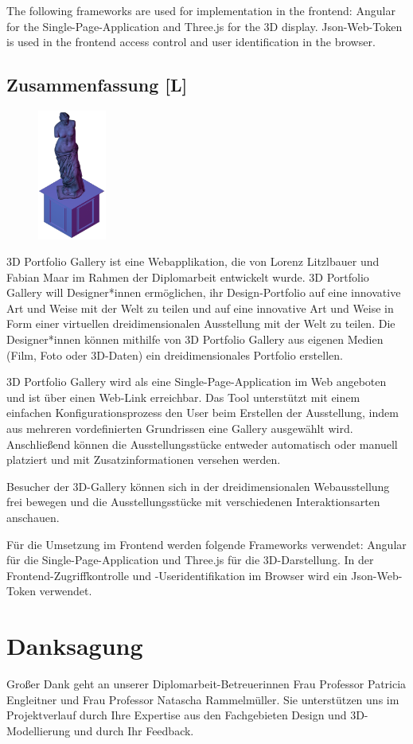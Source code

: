 The following frameworks are used for implementation in the frontend: Angular for the Single-Page-Application and Three.js for the 3D display. Json-Web-Token is used in the frontend access control and user identification in the browser.
\newpage
\begin{spacing}{1}
    \chapter*{Zusammenfassung [L]}
\end{spacing}
\begin{figure}
    \begin{center}
      \includegraphics[width=0.2\textwidth]{pics/statue.png}
    \end{center}
\end{figure}
3D Portfolio Gallery ist eine Webapplikation, die von Lorenz Litzlbauer und Fabian Maar im Rahmen der Diplomarbeit entwickelt wurde. 3D Portfolio Gallery will Designer*innen ermöglichen, ihr Design-Portfolio auf eine innovative Art und Weise mit der Welt zu teilen und auf eine innovative Art und Weise in Form einer virtuellen dreidimensionalen Ausstellung mit der Welt zu teilen. Die Designer*innen können mithilfe von 3D Portfolio Gallery aus eigenen Medien (Film, Foto oder 3D-Daten) ein dreidimensionales Portfolio erstellen.

3D Portfolio Gallery wird als eine Single-Page-Application im Web angeboten und ist über einen Web-Link erreichbar. Das Tool unterstützt mit einem einfachen Konfigurationsprozess den User beim Erstellen der Ausstellung, indem aus mehreren vordefinierten Grundrissen eine Gallery ausgewählt wird. Anschließend können die Ausstellungsstücke entweder automatisch oder manuell platziert und mit Zusatzinformationen versehen werden.

Besucher der 3D-Gallery können sich in der dreidimensionalen Webausstellung frei bewegen und die Ausstellungsstücke mit verschiedenen Interaktionsarten anschauen.

Für die Umsetzung im Frontend werden folgende Frameworks verwendet: Angular für die Single-Page-Application und Three.js für die 3D-Darstellung. In der Frontend-Zugriffkontrolle und -Useridentifikation im Browser wird ein Json-Web-Token verwendet.

\chapter*{Danksagung}
Großer Dank geht an unserer Diplomarbeit-Betreuerinnen
Frau Professor Patricia Engleitner und Frau Professor Natascha Rammelmüller. Sie unterstützen uns im Projektverlauf durch Ihre Expertise aus den Fachgebieten Design und 3D-Modellierung und durch Ihr Feedback.
